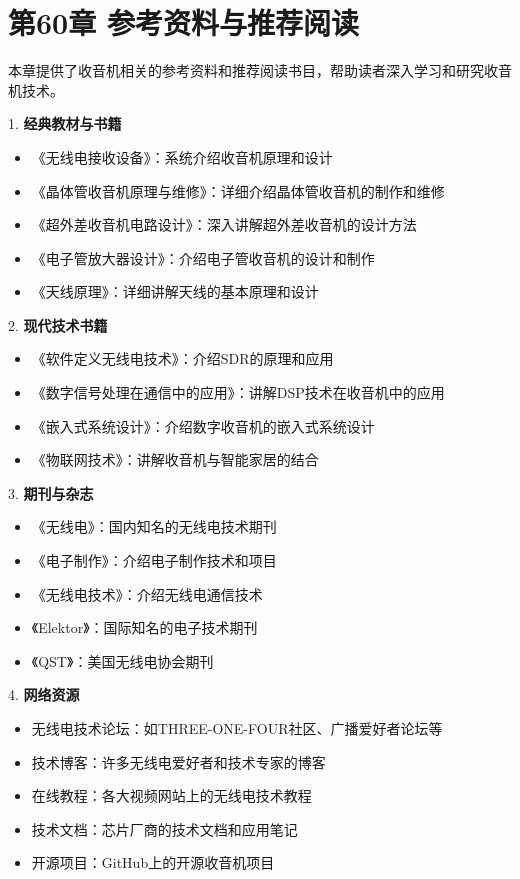 \documentclass[12pt,UTF8]{ctexbook}
\begin{document}
\chapter*{第60章 参考资料与推荐阅读}

本章提供了收音机相关的参考资料和推荐阅读书目，帮助读者深入学习和研究收音机技术。

1. \textbf{经典教材与书籍}
   \begin{itemize}[leftmargin=3.5em]
   \item 《无线电接收设备》：系统介绍收音机原理和设计
   \item 《晶体管收音机原理与维修》：详细介绍晶体管收音机的制作和维修
   \item 《超外差收音机电路设计》：深入讲解超外差收音机的设计方法
   \item 《电子管放大器设计》：介绍电子管收音机的设计和制作
   \item 《天线原理》：详细讲解天线的基本原理和设计
   \end{itemize}

2. \textbf{现代技术书籍}
   \begin{itemize}[leftmargin=3.5em]
   \item 《软件定义无线电技术》：介绍SDR的原理和应用
   \item 《数字信号处理在通信中的应用》：讲解DSP技术在收音机中的应用
   \item 《嵌入式系统设计》：介绍数字收音机的嵌入式系统设计
   \item 《物联网技术》：讲解收音机与智能家居的结合
   \end{itemize}

3. \textbf{期刊与杂志}
   \begin{itemize}[leftmargin=3.5em]
   \item 《无线电》：国内知名的无线电技术期刊
   \item 《电子制作》：介绍电子制作技术和项目
   \item 《无线电技术》：介绍无线电通信技术
   \item 《Elektor》：国际知名的电子技术期刊
   \item 《QST》：美国无线电协会期刊
   \end{itemize}

4. \textbf{网络资源}
   \begin{itemize}[leftmargin=3.5em]
   \item 无线电技术论坛：如THREE-ONE-FOUR社区、广播爱好者论坛等
   \item 技术博客：许多无线电爱好者和技术专家的博客
   \item 在线教程：各大视频网站上的无线电技术教程
   \item 技术文档：芯片厂商的技术文档和应用笔记
   \item 开源项目：GitHub上的开源收音机项目
   \end{itemize}
\end{document}
